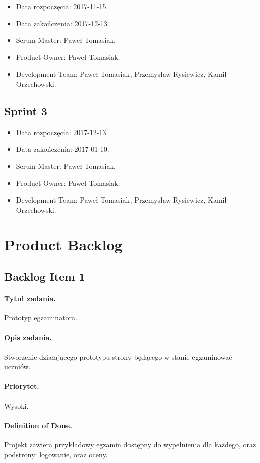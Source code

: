 \documentclass[a4paper]{article}
\begin{document}
\begin{itemize}
\item Data rozpoczęcia: 2017-11-15.
\item  Data zakończenia: 2017-12-13.
\item Scrum Master: Paweł Tomasiak.
\item Product Owner: Paweł Tomasiak.
\item Development Team: Paweł Tomasiak, Przemysław Rysiewicz, Kamil Orzechowski.
\end{itemize}

\subsection{Sprint 3}

\begin{itemize}
\item Data rozpoczęcia: 2017-12-13.
\item  Data zakończenia: 2017-01-10.
\item Scrum Master: Paweł Tomasiak.
\item Product Owner: Paweł Tomasiak.
\item Development Team: Paweł Tomasiak, Przemysław Rysiewicz, Kamil Orzechowski.
\end{itemize}


\section{Product Backlog}

\subsection{Backlog Item 1}
\paragraph{Tytuł zadania.} Prototyp egzaminatora.
\paragraph{Opis zadania.} Stworzenie działającego prototypu strony będącego w stanie egzaminować uczniów.
\paragraph{Priorytet.} Wysoki.
\paragraph{Definition of Done.} Projekt zawiera przykładowy egzamin dostępny do wypełnienia dla każdego, oraz podstrony: logowanie, oraz oceny.
\end{document}
